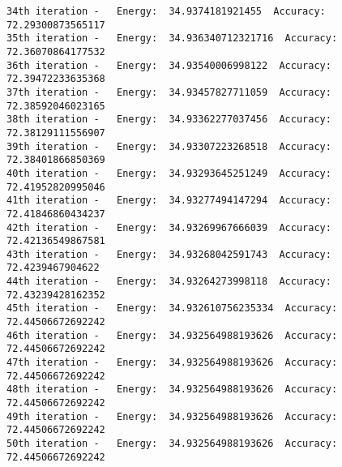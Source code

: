 \documentclass[11pt]{article}
\begin{document}
\begin{Verbatim}[commandchars=\\\{\}]
34th iteration -   Energy:  34.9374181921455  Accuracy:  72.29300873565117
35th iteration -   Energy:  34.936340712321716  Accuracy:  72.36070864177532
36th iteration -   Energy:  34.93540006998122  Accuracy:  72.39472233635368
37th iteration -   Energy:  34.93457827711059  Accuracy:  72.38592046023165
38th iteration -   Energy:  34.93362277037456  Accuracy:  72.38129111556907
39th iteration -   Energy:  34.93307223268518  Accuracy:  72.38401866850369
40th iteration -   Energy:  34.93293645251249  Accuracy:  72.41952820995046
41th iteration -   Energy:  34.93277494147294  Accuracy:  72.41846860434237
42th iteration -   Energy:  34.93269967666039  Accuracy:  72.42136549867581
43th iteration -   Energy:  34.93268042591743  Accuracy:  72.4239467904622
44th iteration -   Energy:  34.93264273998118  Accuracy:  72.43239428162352
45th iteration -   Energy:  34.932610756235334  Accuracy:  72.44506672692242
46th iteration -   Energy:  34.932564988193626  Accuracy:  72.44506672692242
47th iteration -   Energy:  34.932564988193626  Accuracy:  72.44506672692242
48th iteration -   Energy:  34.932564988193626  Accuracy:  72.44506672692242
49th iteration -   Energy:  34.932564988193626  Accuracy:  72.44506672692242
50th iteration -   Energy:  34.932564988193626  Accuracy:  72.44506672692242

    \end{Verbatim}

    \begin{center}
    \end{center}
    { \hspace*{\fill} \\}
    
    \begin{center}
    \end{center}
    { \hspace*{\fill} \\}
    

    
    
    
    
\end{document}
